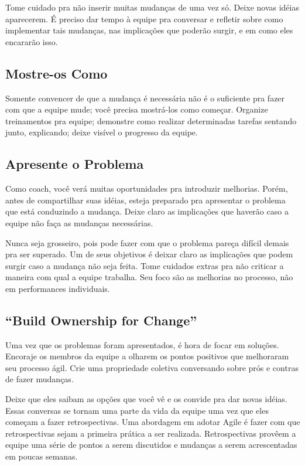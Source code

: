 \documentclass[a4paper, 10pt, font=plain]{abnt}
\begin{document}
Tome cuidado pra não inserir muitas mudanças de uma vez só. Deixe novas idéias aparecerem. É preciso dar tempo à equipe pra conversar e refletir sobre como implementar tais mudanças, nas implicações que poderão surgir, e em como eles encararão isso.


\subsection{Mostre-os Como}
Somente convencer de que a mudança é necessária não é o suficiente pra fazer com que a equipe mude; você precisa mostrá-los como começar. Organize treinamentos pra equipe; demonstre como realizar determinadas tarefas sentando junto, explicando; deixe visível o progresso da equipe.


\subsection{Apresente o Problema}
Como coach, você verá muitas oportunidades pra introduzir melhorias. Porém, antes de compartilhar suas idéias, esteja preparado pra apresentar o problema que está conduzindo a mudança. Deixe claro as implicações que haverão caso a equipe não faça as mudanças necessárias.

Nunca seja grosseiro, pois pode fazer com que o problema pareça difícil demais pra ser superado. Um de seus objetivos é deixar claro as implicações que podem surgir caso a mudança não seja feita. Tome cuidados extras pra não criticar a maneira com qual a equipe trabalha. Seu foco são as melhorias no processo, não em performances individuais.


\subsection{``Build Ownership for Change''}
Uma vez que os problemas foram apresentados, é hora de focar em soluções. Encoraje os membros da equipe a olharem os pontos positivos que melhoraram seu processo ágil. Crie uma propriedade coletiva conversando sobre prós e contras de fazer mudanças.

Deixe que eles saibam as opções que você vê e os convide pra dar novas idéias. Essas conversas se tornam uma parte da vida da equipe uma vez que eles começam a fazer retrospectivas. Uma abordagem em adotar Agile é fazer com que retrospectivas sejam a primeira prática a ser realizada. Retrospectivas provêem a equipe uma série de pontos a serem discutidos e mudanças a serem acrescentadas em poucas semanas.
\end{document}

